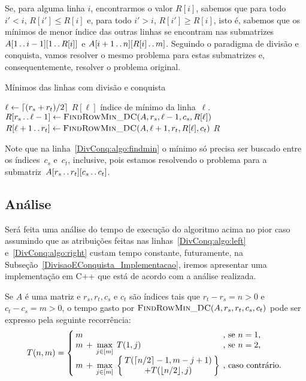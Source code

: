 Se, para alguma linha $i$, encontrarmos o valor $R[i]$, sabemos que para todo $i' < i$, $R[i'] \leq R[i]$ e, para todo $i' > i$, $R[i'] \geq R[i]$, isto é, sabemos que os mínimos de menor índice das outras linhas se encontram nas submatrizes $A[1 \,.\,.\, i-1][1 \,.\,.\, R[i]]$ e $A[i+1 \,.\,.\, n][R[i] \,.\,.\, m]$. Seguindo o paradigma de divisão e conquista, vamos resolver o mesmo problema para estas submatrizes e, consequentemente, resolver o problema original. 

\newcommand{\FRMDC}{\textsc{FindRowMin\_DC}}
\begin{algorithm}[H]
\caption{Mínimos das linhas com divisão e conquista}
\label{DivConq:algo}
\begin{algorithmic}[1]
\Function{\FRMDC}{A, r_s, r_t, c_s, c_t}
    \State $\ell \leftarrow \lceil(r_s+r_t)/2\rceil$
    \State $R[\ell]$ índice de mínimo da linha~$\ell$. \label{DivConq:algo:findmin}
        \State $R[r_s \tdots \ell-1] \rec \FRMDC(A, r_s, \ell-1, c_s, R[\ell])$ \label{DivConq:algo:left}
    \EndIf
        \State $R[\ell+1 \tdots r_t] \rec \FRMDC(A, \ell+1, r_t, R[\ell], c_t)$ \label{DivConq:algo:right}
    \EndIf
    \State \Return $R$
\EndFunction
\end{algorithmic}
\end{algorithm}

Note que na linha~\ref{DivConq:algo:findmin} o mínimo só precisa ser buscado entre os índices~$c_s$ e~$c_t$, inclusive, pois estamos resolvendo o problema para a submatriz~$A[r_s \,.\,.\, r_t][c_s \,.\,.\, c_t]$.

\subsection{Análise}
Será feita uma análise do tempo de execução do algoritmo acima no pior caso assumindo que as atribuições feitas nas linhas~\ref{DivConq:algo:left} e~\ref{DivConq:algo:right} custam tempo constante, futuramente, na Subseção~\ref{DivisaoEConquista_Implementacao}, iremos apresentar uma implementação em C++ que está de acordo com a análise realizada.  

Se $A$ é uma matriz e $r_s,r_t,c_s$ e $c_t$ são índices tais que $r_t-r_s = n > 0$ e $c_t-c_s = m > 0$, o tempo gasto por $\FRMDC(A,r_s,r_t,c_s,c_t)$ pode ser expresso pela seguinte recorrência:
\begin{equation*}
\arraycolsep=2pt
T(n,m) = \left\{
\begin{array}{lllll}
    m &   &                         &                         & \text{, se } n = 1 \text{,} \\
    m & + & \max\limits_{j \in [m]} & T(1,j)                  & \text{, se } n = 2 \text{,} \\[2pt]
    m & + & \max\limits_{j \in [m]} & \left\{\begin{array}{c}
     T(\ceil{n/2}-1,m-j+1) \\
     + T(\floor{n/2},j)    \\
    \end{array} \right\}                                      & \text{, caso contrário.} \\
\end{array}
\right.
\end{equation*}

